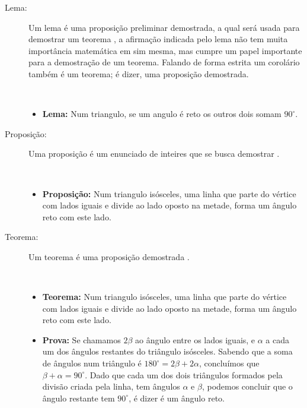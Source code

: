 \begin{description}
\item[Lema:]  Um lema é uma proposição preliminar demostrada, 
a qual será usada para demostrar um teorema \cite[pp. 49]{fossa2009introducao}\cite[pp. 41]{solow1987como},
a afirmação indicada pelo lema não tem muita importância matemática em sim mesma, mas cumpre um papel importante para a demostração de um teorema.
Falando de forma estrita um corolário também é um teorema; é dizer, uma proposição demostrada.
\begin{example}~\\
\begin{itemize}
\item \textbf{Lema:} Num triangulo, se um angulo é reto os outros dois somam $90^{\circ}$.
\end{itemize}
\end{example}

\item[Proposição:]  Uma proposição é um enunciado de inteires que se busca demostrar \cite[pp. 41]{solow1987como}.
\begin{example}~\\
\begin{itemize}
\item \textbf{Proposição:} Num triangulo isósceles, uma linha que parte do vértice com lados iguais e divide ao lado oposto na metade,
forma um ângulo reto com este lado.
\end{itemize}
\end{example}

\item[Teorema:]  Um teorema é uma proposição demostrada \cite[pp. 49]{fossa2009introducao} \cite[pp. 41]{solow1987como}.
\begin{example}~\\
\begin{itemize}
\item \textbf{Teorema:} Num triangulo isósceles, uma linha que parte do vértice com lados iguais e divide ao lado oposto na metade,
forma um ângulo reto com este lado.
\item \textbf{Prova:}  Se chamamos $2\beta$ ao ângulo entre os lados iguais, 
e $\alpha$ a cada um dos ângulos restantes do triângulo isósceles. Sabendo
que a soma de ângulos num triângulo é $180^{\circ}=2\beta+2\alpha$,
concluímos que $\beta+\alpha=90^{\circ}$.
Dado que cada um dos dois triângulos formados pela divisão criada pela linha, tem ângulos $\alpha$ e $\beta$,
podemos concluir que o ângulo restante tem $90^{\circ}$, é dizer é um ângulo reto.
\end{itemize}
\end{example}


\end{description}
